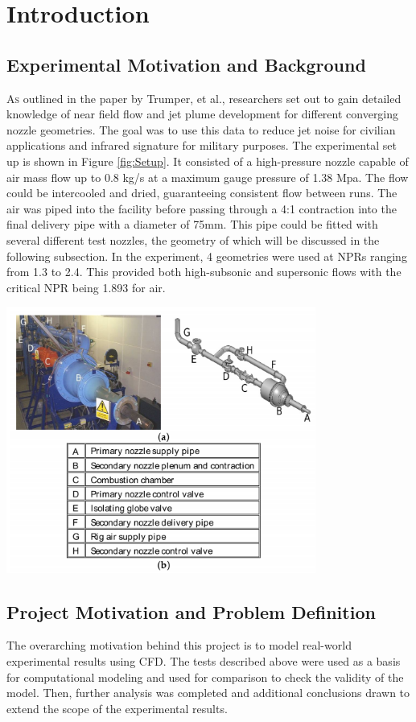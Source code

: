 \documentclass[12pt]{article} %
\begin{document}
\section{Introduction}
\subsection{Experimental Motivation and Background}
\lettrine{A}{s} outlined in the paper by Trumper, et al., researchers set out to gain detailed knowledge of near field flow and jet plume development for different converging nozzle geometries.\cite{MilesT.Trumper2018IoNE} The goal was to use this data to reduce jet noise for civilian applications and infrared signature for military purposes. The experimental set up is shown in Figure \ref{fig:Setup}. It consisted of a high-pressure nozzle capable of air mass flow up to 0.8 kg/s at a maximum gauge pressure of 1.38 Mpa. The flow could be intercooled and dried, guaranteeing consistent flow between runs. The air was piped into the facility before passing through a 4:1 contraction into the final delivery pipe with a diameter of 75mm. This pipe could be fitted with several different test nozzles, the geometry of which will be discussed in the following subsection. In the experiment, 4 geometries were used at NPRs ranging from 1.3 to 2.4. This provided both high-subsonic and supersonic flows with the critical NPR being 1.893 for air.

\begin{center}
    \includegraphics[width = 4in]{setup.PNG}
    \label{fig:Setup}
\end{center}

\subsection{Project Motivation and Problem Definition}
The overarching motivation behind this project is to model real-world experimental results using CFD. The tests described above were used as a basis for computational modeling and used for comparison to check the validity of the model. Then, further analysis was completed and additional conclusions drawn to extend the scope of the experimental results. 
\end{document}
